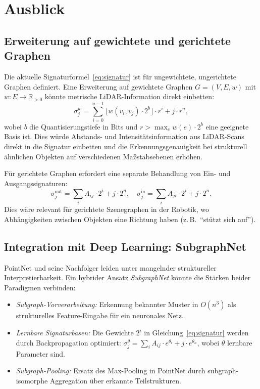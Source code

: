 ﻿\documentclass[a4paper,12pt]{article}
\theoremstyle{definition}
\begin{document}
\section{Ausblick}

\subsection{Erweiterung auf gewichtete und gerichtete Graphen}

Die aktuelle Signaturformel~\eqref{eq:signatur} ist für ungewichtete,
ungerichtete Graphen definiert. Eine Erweiterung auf gewichtete Graphen
$G = (V, E, w)$ mit $w: E \to \mathbb{R}_{>0}$ könnte metrische
LiDAR-Information direkt einbetten:
\[
  \sigma_j^w = \sum_{i=0}^{n-1} \lfloor w(v_i, v_j) \cdot 2^b \rfloor
               \cdot r^i + j \cdot r^n,
\]
wobei $b$ die Quantisierungstiefe in Bits und $r > \max_e w(e) \cdot
2^b$ eine geeignete Basis ist. Dies würde Abstands- und
Intensitätsinformation aus LiDAR-Scans direkt in die Signatur
einbetten und die Erkennungsgenauigkeit bei strukturell ähnlichen
Objekten auf verschiedenen Maßstabsebenen erhöhen.

Für gerichtete Graphen erfordert eine separate Behandlung von
Ein- und Ausgangssignaturen:
\[
  \sigma_j^{\mathrm{out}} = \sum_i A_{ij} \cdot 2^i + j \cdot 2^n,
  \quad
  \sigma_j^{\mathrm{in}}  = \sum_i A_{ji} \cdot 2^i + j \cdot 2^n.
\]
Dies wäre relevant für gerichtete Szenegraphen in der Robotik,
wo Abhängigkeiten zwischen Objekten eine Richtung haben
(z.\,B.\ ``stützt sich auf'').

\subsection{Integration mit Deep Learning: SubgraphNet}

PointNet \citep{Qi2017} und seine Nachfolger leiden unter mangelnder
struktureller Interpretierbarkeit. Ein hybrider Ansatz
\emph{SubgraphNet} könnte die Stärken beider Paradigmen verbinden:

\begin{itemize}
  \item \emph{Subgraph-Vorverarbeitung:} Erkennung bekannter Muster
        in $O(n^3)$ als strukturelles Feature-Eingabe für ein neuronales
        Netz.
  \item \emph{Lernbare Signaturbasen:} Die Gewichte $2^i$ in
        Gleichung~\eqref{eq:signatur} werden durch Backpropagation
        optimiert: $\sigma_j^\theta = \sum_i A_{ij} \cdot e^{\theta_i}
        + j \cdot e^{\theta_n}$, wobei $\theta$ lernbare Parameter sind.
  \item \emph{Subgraph-Pooling:} Ersatz des Max-Pooling in PointNet
        durch subgraph-isomorphe Aggregation über erkannte Teilstrukturen.
\end{itemize}
\end{document}
